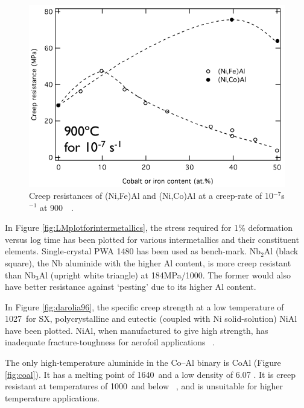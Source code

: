 \begin{figure}[H]
\begin{center}
\includegraphics[width=12cm]{NiAlCo}
\caption{Creep resistances of (Ni,Fe)Al and (Ni,Co)Al at a creep-rate of 10$^{-7}$s$^{-1}$ at 900\celsius\ ~\cite{jung87}.}
\label{fig:NiAlCo}
\end{center}
\end{figure}
%

 
In Figure \ref{fig:LMplotforintermetallics}, the stress required for 1\% deformation versus log time has been plotted for various intermetallics and their constituent elements.  Single-crystal PWA 1480 has been used as bench-mark.  Nb$_2$Al (black square), the Nb aluminide with the higher Al content, is more creep resistant than Nb$_3$Al (upright white triangle) at 184MPa/1000\celsius.  The former would also have better resistance against `pesting' due to its higher Al content.

In Figure \ref{fig:darolia96}, the specific creep strength at a low temperature of 1027\celsius\ for SX, polycrystalline and eutectic (coupled with Ni solid-solution) NiAl have been plotted.  NiAl, when manufactured to give high strength, has inadequate fracture-toughness for aerofoil applications ~\cite{darolia96}.

The only high-temperature aluminide in the Co--Al binary is CoAl (Figure \ref{fig:coal}).  It has a melting point of 1640\celsius\ and a low density of 6.07 \gram\usk\centi\rpcubic\meter.  It is creep resistant at temperatures of 1000\celsius\ and below ~\cite{anton89, jung87}, and is unsuitable for higher temperature applications.  

